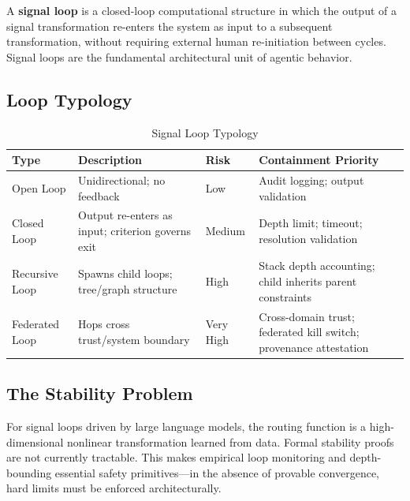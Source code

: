 \documentclass[11pt,a4paper]{article}
\begin{document}
\begin{definitionbox}[title=Definition 4.1 --- Signal Loop]
A \textbf{signal loop} is a closed-loop computational structure in which the output of a signal
transformation re-enters the system as input to a subsequent transformation, without requiring
external human re-initiation between cycles. Signal loops are the fundamental architectural unit
of agentic behavior.
\end{definitionbox}

\subsection{Loop Typology}

\begin{table}[htbp]
  \centering\small
  \caption{Signal Loop Typology}
  \label{tab:loops}
  \begin{tabularx}{\linewidth}{L{2.3cm} L{3.5cm} L{2cm} L{5cm}}
    \toprule
    \textbf{Type} & \textbf{Description} & \textbf{Risk} & \textbf{Containment Priority} \\
    \midrule
    Open Loop      & Unidirectional; no feedback                    & Low       & Audit logging; output validation \\
    Closed Loop    & Output re-enters as input; criterion governs exit & Medium & Depth limit; timeout; resolution validation \\
    Recursive Loop & Spawns child loops; tree/graph structure        & High      & Stack depth accounting; child inherits parent constraints \\
    Federated Loop & Hops cross trust/system boundary               & Very High & Cross-domain trust; federated kill switch; provenance attestation \\
    \bottomrule
  \end{tabularx}
\end{table}

\subsection{The Stability Problem}

For signal loops driven by large language models, the routing function is a high-dimensional
nonlinear transformation learned from data. Formal stability proofs are not currently tractable.
This makes empirical loop monitoring and depth-bounding essential safety primitives---in the
absence of provable convergence, hard limits must be enforced architecturally.
\end{document}
